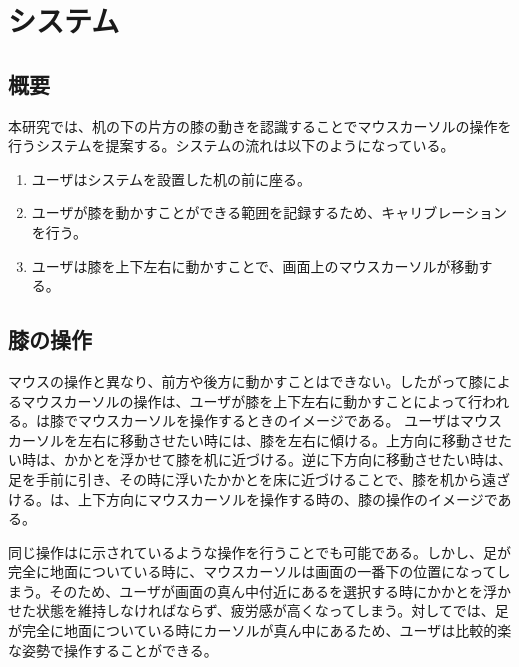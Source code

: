 \chapter{システム}
\section{概要}
本研究では、机の下の片方の膝の動きを認識することでマウスカーソルの操作を行うシステムを提案する。システムの流れは以下のようになっている。
\begin{enumerate}
	\item ユーザはシステムを設置した机の前に座る。
	\item ユーザが膝を動かすことができる範囲を記録するため、キャリブレーションを行う。
	\item ユーザは膝を上下左右に動かすことで、画面上のマウスカーソルが移動する。
\end{enumerate}
\section{膝の操作}
マウスの操作と異なり、前方や後方に動かすことはできない。したがって膝によるマウスカーソルの操作は、ユーザが膝を上下左右に動かすことによって行われる。は膝でマウスカーソルを操作するときのイメージである。
ユーザはマウスカーソルを左右に移動させたい時には、膝を左右に傾ける。上方向に移動させたい時は、かかとを浮かせて膝を机に近づける。逆に下方向に移動させたい時は、足を手前に引き、その時に浮いたかかとを床に近づけることで、膝を机から遠ざける。は、上下方向にマウスカーソルを操作する時の、膝の操作のイメージである。

同じ操作はに示されているような操作を行うことでも可能である。しかし、足が完全に地面についている時に、マウスカーソルは画面の一番下の位置になってしまう。そのため、ユーザが画面の真ん中付近にあるを選択する時にかかとを浮かせた状態を維持しなければならず、疲労感が高くなってしまう。対してでは、足が完全に地面についている時にカーソルが真ん中にあるため、ユーザは比較的楽な姿勢で操作することができる。

